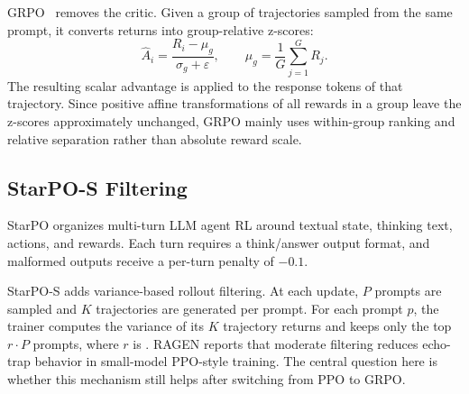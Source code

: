 GRPO~\citep{shao2024deepseekmath} removes the critic. Given a group of trajectories sampled from the same prompt, it converts returns into group-relative z-scores:
\begin{equation}
\hat{A}_i = \frac{R_i-\mu_g}{\sigma_g+\varepsilon},
\qquad
\mu_g=\frac{1}{G}\sum_{j=1}^{G}R_j.
\end{equation}
The resulting scalar advantage is applied to the response tokens of that trajectory. Since positive affine transformations of all rewards in a group leave the z-scores approximately unchanged, GRPO mainly uses within-group ranking and relative separation rather than absolute reward scale.

\subsection{StarPO-S Filtering}

StarPO organizes multi-turn LLM agent RL around textual state, thinking text, actions, and rewards. Each turn requires a think/answer output format, and malformed outputs receive a per-turn penalty of \(-0.1\).

StarPO-S adds variance-based rollout filtering. At each update, \(P\) prompts are sampled and \(K\) trajectories are generated per prompt. For each prompt \(p\), the trainer computes the variance of its \(K\) trajectory returns and keeps only the top \(r\cdot P\) prompts, where \(r\) is . RAGEN reports that moderate filtering reduces echo-trap behavior in small-model PPO-style training. The central question here is whether this mechanism still helps after switching from PPO to GRPO.
